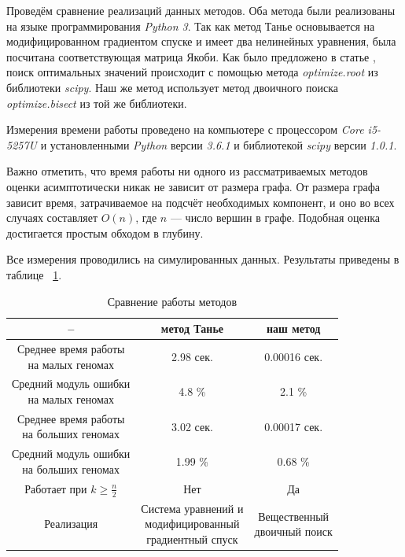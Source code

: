 Проведём сравнение реализаций данных методов.
Оба метода были реализованы на языке программирования \textit{Python 3}.
Так как метод Танье основывается на модифицированном градиентом спуске и имеет два нелинейных уравнения, была посчитана соответствующая матрица Якоби.
Как было предложено в статье \cite{fr-4}, поиск оптимальных значений происходит с помощью метода \textit{optimize.root} из библиотеки \textit{scipy}.
Наш же метод использует метод двоичного поиска \textit{optimize.bisect} из той же библиотеки.

Измерения времени работы проведено на компьютере с процессором \textit{Core i5-5257U} и установленными \textit{Python} версии \textit{3.6.1} и библиотекой \textit{scipy} версии \textit{1.0.1}.

Важно отметить, что время работы ни одного из рассматриваемых методов оценки асимптотически никак не зависит от размера графа.
От размера графа зависит время, затрачиваемое на подсчёт необходимых компонент, и оно во всех случаях составляет $O(n)$, где $n$ --- число вершин в графе.
Подобная оценка достигается простым обходом в глубину.

Все измерения проводились на симулированных данных. Результаты приведены в таблице ~\ref{performance-compare}.
\begin{table}[!h]
    \caption{Сравнение работы методов}
    \centering
    \begin{tabular}{|*{3}{c|}}\hline
        -- & метод Танье & наш метод \\\hline
        \makecell{Среднее время работы \\ на малых геномах}       & 2.98 сек. & 0.00016 сек. \\\hline
        \makecell{Средний модуль ошибки \\ на малых геномах}      & 4.8 \%    & 2.1 \% \\\hline
        \makecell{Среднее время работы \\ на больших геномах}     & 3.02 сек. & 0.00017 сек. \\\hline
        \makecell{Средний модуль ошибки \\ на больших геномах}    & 1.99 \%   & 0.68 \% \\\hline
        Работает при $k \geq \frac n 2$                           & Нет       & Да \\\hline
        Реализация     & \makecell{Система уравнений и \\ модифицированный \\ градиентный спуск} & \makecell{Вещественный \\ двоичный поиск} \\\hline
    \end{tabular}
    \label{performance-compare}
\end{table}

